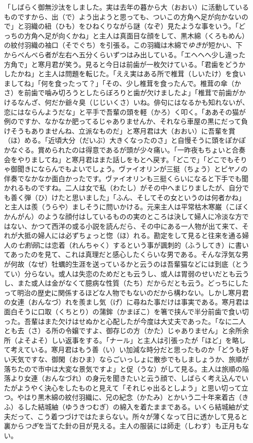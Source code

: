 \documentclass{book}
\begin{document}
「しばらく御無沙汰をしました。実は去年の暮から大（おおい）に活動しているものですから、出（で）よう出ようと思っても、ついこの方角へ足が向かないので」と羽織の紐（ひも）をひねくりながら謎（なぞ）見たような事をいう。「どっちの方角へ足が向くかね」と主人は真面目な顔をして、黒木綿（くろもめん）の紋付羽織の袖口（そでぐち）を引張る。この羽織は木綿で\emph{ゆき}が短かい、下からべんべら者が左右へ五分くらいずつはみ出している。「エヘヘヘ少し違った方角で」と寒月君が笑う。見ると今日は前歯が一枚欠けている。「君歯をどうかしたかね」と主人は問題を転じた。「ええ実はある所で椎茸（しいたけ）を食いましてね」「何を食ったって？」「その、少し椎茸を食ったんで。椎茸の傘（かさ）を前歯で噛み切ろうとしたらぼろりと歯が欠けましたよ」「椎茸で前歯がかけるなんざ、何だか爺々臭（じじいくさ）いね。俳句にはなるかも知れないが、恋にはならんようだな」と平手で吾輩の頭を軽（かろ）く叩く。「ああその猫が例のですか、なかなか肥ってるじゃありませんか、それなら車屋の黒にだって負けそうもありませんね、立派なものだ」と寒月君は大（おおい）に吾輩を賞（ほ）める。「近頃大分（だいぶ）大きくなったのさ」と自慢そうに頭をぽかぽかなぐる。賞められたのは得意であるが頭が少々痛い。「一昨夜もちょいと合奏会をやりましてね」と寒月君はまた話しをもとへ戻す。「どこで」「どこでもそりゃ御聞きにならんでもよいでしょう。ヴァイオリンが三挺（ちょう）とピヤノの伴奏でなかなか面白かったです。ヴァイオリンも三挺くらいになると下手でも聞かれるものですね。二人は女で私（わたし）がその中へまじりましたが、自分でも善く弾（ひ）けたと思いました」「ふん、そしてその女というのは何者かね」と主人は羨（うらや）ましそうに問いかける。元来主人は平常枯木寒巌（こぼくかんがん）のような顔付はしているものの実のところは決して婦人に冷淡な方ではない、かつて西洋の或る小説を読んだら、その中にある一人物が出て来て、それが大抵の婦人には必ずちょっと惚（ほ）れる。勘定をして見ると往来を通る婦人の\emph{七割弱}には恋着（れんちゃく）するという事が諷刺的（ふうしてき）に書いてあったのを見て、これは真理だと感心したくらいな男である。そんな浮気な男が何故（なぜ）牡蠣的生涯を送っているかと云うのは吾輩猫などには到底（とうてい）分らない。或人は失恋のためだとも云うし、或人は胃弱のせいだとも云うし、また或人は金がなくて臆病な性質（たち）だからだとも云う。どっちにしたって明治の歴史に関係するほどな人物でもないのだから構わない。しかし寒月君の女連（おんなづ）れを羨まし気（げ）に尋ねた事だけは事実である。寒月君は面白そうに口取（くちとり）の蒲鉾（かまぼこ）を箸で挟んで半分前歯で食い切った。吾輩はまた欠けはせぬかと心配したが今度は大丈夫であった。「なに二人とも去（さ）る所の令嬢ですよ、御存じの方（かた）じゃありません」と余所余所（よそよそ）しい返事をする。「ナール」と主人は引張ったが「ほど」を略して考えている。寒月君はもう善（い）い加減な時分だと思ったものか「どうも好い天気ですな、御閑（おひま）ならごいっしょに散歩でもしましょうか、旅順が落ちたので市中は大変な景気ですよ」と促（うな）がして見る。主人は旅順の陥落より女連（おんなづれ）の身元を聞きたいと云う顔で、しばらく考え込んでいたがようやく決心をしたものと見えて「それじゃ出るとしよう」と思い切って立つ。やはり黒木綿の紋付羽織に、兄の紀念（かたみ）とかいう二十年来着古（きふ）るした結城紬（ゆうきつむぎ）の綿入を着たままである。いくら結城紬が丈夫だって、こう着つづけではたまらない。所々が薄くなって日に透かして見ると裏から\emph{つぎ}を当てた針の目が見える。主人の服装には師走（しわす）も正月もない。
\end{document}
